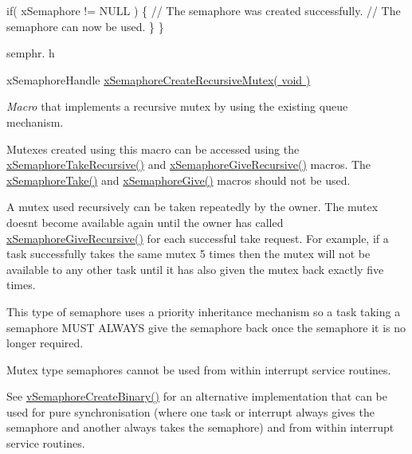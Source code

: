 \begin{DoxyPre}   if( xSemaphore != NULL )
   \{
       // The semaphore was created successfully.
       // The semaphore can now be used.  
   \}
\}
\end{DoxyPre}


semphr. h 
\begin{DoxyPre}xSemaphoreHandle \hyperlink{semphr_8h_a1bbc843be5a41ea83d2693b2189fc0f8}{xSemaphoreCreateRecursiveMutex( void )}\end{DoxyPre}


{\itshape Macro} that implements a recursive mutex by using the existing queue mechanism.

Mutexes created using this macro can be accessed using the \hyperlink{semphr_8h_ad395f4bba51eea6af3397d72bc079e4d}{x\+Semaphore\+Take\+Recursive()} and \hyperlink{semphr_8h_a398d66b17856c22dd49d39aaac42f105}{x\+Semaphore\+Give\+Recursive()} macros. The \hyperlink{semphr_8h_af116e436d2a5ae5bd72dbade2b5ea930}{x\+Semaphore\+Take()} and \hyperlink{semphr_8h_aae55761cabfa9bf85c8f4430f78c0953}{x\+Semaphore\+Give()} macros should not be used.

A mutex used recursively can be \textquotesingle{}taken\textquotesingle{} repeatedly by the owner. The mutex doesn\textquotesingle{}t become available again until the owner has called \hyperlink{semphr_8h_a398d66b17856c22dd49d39aaac42f105}{x\+Semaphore\+Give\+Recursive()} for each successful \textquotesingle{}take\textquotesingle{} request. For example, if a task successfully \textquotesingle{}takes\textquotesingle{} the same mutex 5 times then the mutex will not be available to any other task until it has also \textquotesingle{}given\textquotesingle{} the mutex back exactly five times.

This type of semaphore uses a priority inheritance mechanism so a task \textquotesingle{}taking\textquotesingle{} a semaphore M\+U\+ST A\+L\+W\+A\+YS \textquotesingle{}give\textquotesingle{} the semaphore back once the semaphore it is no longer required.

Mutex type semaphores cannot be used from within interrupt service routines.

See \hyperlink{semphr_8h_ae10bffadd26fbd5bcce76bf33a83ef30}{v\+Semaphore\+Create\+Binary()} for an alternative implementation that can be used for pure synchronisation (where one task or interrupt always \textquotesingle{}gives\textquotesingle{} the semaphore and another always \textquotesingle{}takes\textquotesingle{} the semaphore) and from within interrupt service routines.

